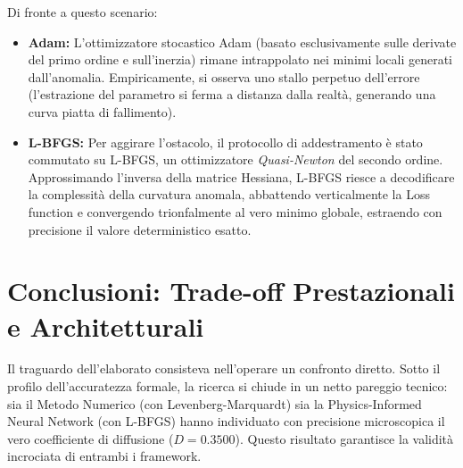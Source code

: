\documentclass[12pt,a4paper]{article}
\begin{document}
Di fronte a questo scenario:
\begin{itemize}
    \item \textbf{Adam:} L'ottimizzatore stocastico Adam (basato esclusivamente sulle derivate del primo ordine e sull'inerzia) rimane intrappolato nei minimi locali generati dall'anomalia. Empiricamente, si osserva uno stallo perpetuo dell'errore (l'estrazione del parametro si ferma a distanza dalla realtà, generando una curva piatta di fallimento).
    \item \textbf{L-BFGS:} Per aggirare l'ostacolo, il protocollo di addestramento è stato commutato su L-BFGS, un ottimizzatore \textit{Quasi-Newton} del secondo ordine. Approssimando l'inversa della matrice Hessiana, L-BFGS riesce a decodificare la complessità della curvatura anomala, abbattendo verticalmente la Loss function e convergendo trionfalmente al vero minimo globale, estraendo con precisione il valore deterministico esatto.
\end{itemize}

\section{Conclusioni: Trade-off Prestazionali e Architetturali}
Il traguardo dell'elaborato consisteva nell'operare un confronto diretto. 
Sotto il profilo dell'accuratezza formale, la ricerca si chiude in un netto pareggio tecnico: sia il Metodo Numerico (con Levenberg-Marquardt) sia la Physics-Informed Neural Network (con L-BFGS) hanno individuato con precisione microscopica il vero coefficiente di diffusione ($D = 0.3500$). 
Questo risultato garantisce la validità incrociata di entrambi i framework.
\end{document}
